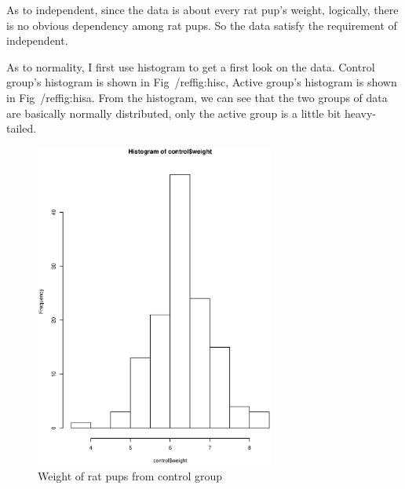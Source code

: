 \documentclass[12pt]{article}
\begin{document}
\begin{enumerate}
\begin{enumerate}
    As to independent, since the data is about every rat pup's
    weight, logically, there is no obvious dependency among rat
    pups. So the data satisfy the requirement of independent.

    As to normality, I first use histogram to get a first look on
    the data. Control group's histogram is shown in
    Fig~/ref{fig:hisc}, Active group's histogram is shown in
    Fig~/ref{fig:hisa}. From the histogram, we can see that the two
    groups of data are basically normally distributed, only the
    active group is a little bit heavy-tailed.

    \begin{figure}[ht!]
      \centering
      \includegraphics[width=0.7\textwidth]{hist_control}
      \caption{Weight of rat pups from control group \label{fig:histc}}
    \end{figure}


\end{enumerate}
\end{enumerate}
\end{document}
